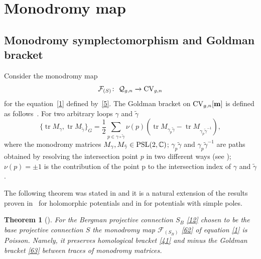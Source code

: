 \documentclass[pdftex]{sigma}
\numberwithin{equation}{section}
\newtheorem{Theorem}{Theorem}[section]
\theoremstyle{definition}
\newcommand{\CC}{\mathbb{C}}
\begin{document}
\section{Monodromy map}\label{section3}

\subsection{Monodromy symplectomorphism and Goldman bracket}
Consider the monodromy map
\begin{equation}\label{62}
\mathcal{F}_{(S)}\colon \ \mathcal{Q}_{g,n} \xrightarrow[]{} {\rm CV}_{g,n}\end{equation}
for the equation~\eqref{1} defined by~\eqref{5}.
The Goldman bracket on ${\rm CV}_{g,n}[\mathbf{m}]$ is defined as follows~\cite{Goldman_1984}. For two arbitrary loops $\gamma$ and $\tilde{\gamma}$
\begin{equation}\label{63}
\{\operatorname{tr}M_\gamma, \operatorname{tr}M_{\tilde{\gamma}} \}_G=\frac{1}{2}\sum_{p \in \gamma \circ \tilde{\gamma}}\nu(p)(\operatorname{tr}M_{\gamma_p \tilde{\gamma}} - \operatorname{tr}M_{\gamma_p \tilde{\gamma}^{-1}} ),
\end{equation}
where the monodromy matrices $M_\gamma, M_{\tilde{\gamma}} \in {\rm PSL}(2, \CC) $; $\gamma_p \tilde{\gamma}$ and $\gamma_p \tilde{\gamma}^{-1}$
 are paths obtained by resolving the intersection point $p$ in two different ways (see \cite{Goldman_1984}); $\nu(p)=\pm 1 $ is the contribution of the point p to the
intersection index of $\gamma$ and $\tilde{\gamma}$.

The following theorem was stated in \cite{bertola2021wkb} and it is a natural extension of the results proven in~\cite{Bertola_2017} for holomorphic potentials and in \cite{korotkin2018periods} for potentials with simple poles.

\begin{Theorem}[\cite{bertola2021wkb}]\label{Th_4}
For the Bergman projective connection $S_{B}$ \eqref{12} chosen to be the base projective connection $S$ the monodromy map $\mathcal{F}_{(S_B)}$ \eqref{62} of equation \eqref{1} is Poisson. Namely, it preserves homological bracket \eqref{41} and minus the Goldman bracket \eqref{63} between traces of monodromy matrices.
\end{Theorem}
\end{document}
